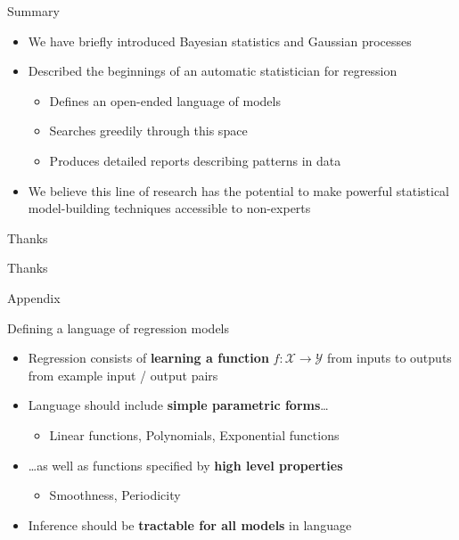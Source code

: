 \begin{frame}{Summary}
  \begin{itemize}
    \item We have briefly introduced Bayesian statistics and Gaussian processes
    \vspace{\baselineskip}
    \item Described the beginnings of an automatic statistician for regression
    \begin{itemize}
      \item Defines an open-ended language of models
      \item Searches greedily through this space
      \item Produces detailed reports describing patterns in data
    \end{itemize}
    \vspace{\baselineskip}
    \item We believe this line of research has the potential to make powerful statistical model-building techniques accessible to non-experts
  \end{itemize}
\end{frame}

\begin{frame}{Thanks}
  \begin{center}
  \Huge
  Thanks
  \end{center}
\end{frame}

\begin{frame}{Appendix}
\end{frame}

\begin{frame}{Defining a language of regression models}
  \begin{itemize}
    \item Regression consists of {\bf learning a function} $f: \mathcal{X} \to \mathcal{Y}$ from inputs to outputs from example input / output pairs
    \vspace{\baselineskip}
    \item Language should include {\bf simple parametric forms}\ldots
    \begin{itemize}
       \item \eg Linear functions, Polynomials, Exponential functions
     \end{itemize}
    \vspace{\baselineskip}
    \item \ldots as well as functions specified by {\bf high level properties}
    \begin{itemize}
       \item \eg Smoothness, Periodicity
     \end{itemize}
    \vspace{\baselineskip}
    \item Inference should be {\bf tractable for all models} in language
  \end{itemize}
\end{frame}

